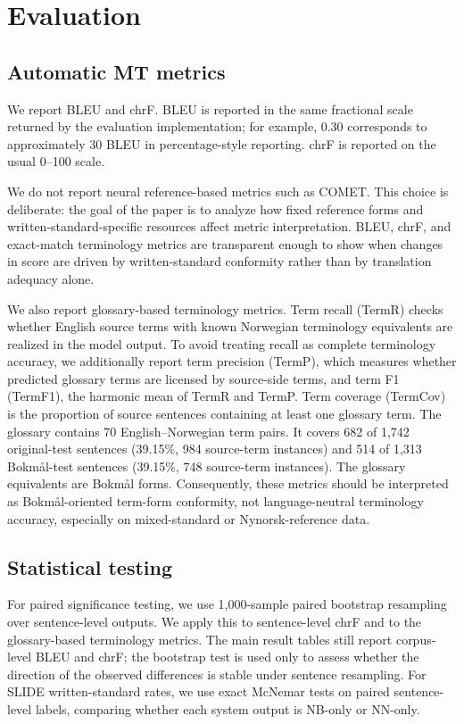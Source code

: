 \documentclass[11pt]{article}
\newcommand{\nb}{Bokm{\aa}l}
\newcommand{\nn}{Nynorsk}
\begin{document}
\section{Evaluation}

\subsection{Automatic MT metrics}

We report BLEU and chrF. BLEU is reported in the same fractional scale returned by the evaluation implementation; for example, 0.30 corresponds to approximately 30 BLEU in percentage-style reporting. chrF is reported on the usual 0--100 scale.

We do not report neural reference-based metrics such as COMET. This choice is deliberate: the goal of the paper is to analyze how fixed reference forms and written-standard-specific resources affect metric interpretation. BLEU, chrF, and exact-match terminology metrics are transparent enough to show when changes in score are driven by written-standard conformity rather than by translation adequacy alone.

We also report glossary-based terminology metrics. Term recall (TermR) checks whether English source terms with known Norwegian terminology equivalents are realized in the model output. To avoid treating recall as complete terminology accuracy, we additionally report term precision (TermP), which measures whether predicted glossary terms are licensed by source-side terms, and term F1 (TermF1), the harmonic mean of TermR and TermP. Term coverage (TermCov) is the proportion of source sentences containing at least one glossary term. The glossary contains 70 English--Norwegian term pairs. It covers 682 of 1,742 original-test sentences (39.15\%, 984 source-term instances) and 514 of 1,313 \nb{}-test sentences (39.15\%, 748 source-term instances). The glossary equivalents are \nb{} forms. Consequently, these metrics should be interpreted as \nb{}-oriented term-form conformity, not language-neutral terminology accuracy, especially on mixed-standard or \nn{}-reference data.

\subsection{Statistical testing}

For paired significance testing, we use 1,000-sample paired bootstrap resampling over sentence-level outputs. We apply this to sentence-level chrF and to the glossary-based terminology metrics. The main result tables still report corpus-level BLEU and chrF; the bootstrap test is used only to assess whether the direction of the observed differences is stable under sentence resampling. For SLIDE written-standard rates, we use exact McNemar tests on paired sentence-level labels, comparing whether each system output is NB-only or NN-only.
\end{document}
